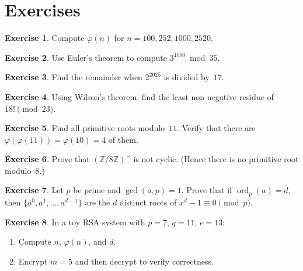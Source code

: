 \documentclass[12pt,a4paper,openany]{book}
\theoremstyle{definition}
\newtheorem{exercise}{Exercise}[chapter]
\theoremstyle{plain}
\theoremstyle{remark}
\newcommand{\Z}{\mathbb{Z}}
\DeclareMathOperator{\ord}{ord}
\begin{document}
\section{Exercises}
\label{sec:ch4-exercises}

\begin{exercise}
\label{exer:totient-compute}
Compute $\varphi(n)$ for $n = 100, 252, 1000, 2520$.
\end{exercise}

\begin{exercise}
\label{exer:euler-app}
Use Euler's theorem to compute $3^{1000} \bmod 35$.
\end{exercise}

\begin{exercise}
\label{exer:fermat-app}
Find the remainder when $2^{2025}$ is divided by~$17$.
\end{exercise}

\begin{exercise}
\label{exer:wilson-app}
Using Wilson's theorem, find the least non-negative residue of
$18! \pmod{23}$.
\end{exercise}

\begin{exercise}
\label{exer:prim-root-11}
Find all primitive roots modulo~$11$.  Verify that there are
$\varphi(\varphi(11)) = \varphi(10) = 4$ of them.
\end{exercise}

\begin{exercise}
\label{exer:prim-root-existence}
Prove that $(\Z/8\Z)^\times$ is not cyclic.  (Hence there is no primitive
root modulo~$8$.)
\end{exercise}

\begin{exercise}
\label{exer:order-properties}
Let $p$ be prime and $\gcd(a,p) = 1$.  Prove that if $\ord_p(a) = d$, then
$\{a^0, a^1, \dots, a^{d-1}\}$ are the $d$ distinct roots of $x^d - 1
\equiv 0 \pmod{p}$.
\end{exercise}

\begin{exercise}
\label{exer:rsa-1}
In a toy RSA system with $p = 7$, $q = 11$, $e = 13$:
\begin{enumerate}[label=(\alph*)]
  \item Compute $n$, $\varphi(n)$, and $d$.
  \item Encrypt $m = 5$ and then decrypt to verify correctness.
\end{enumerate}
\end{exercise}
\end{document}
